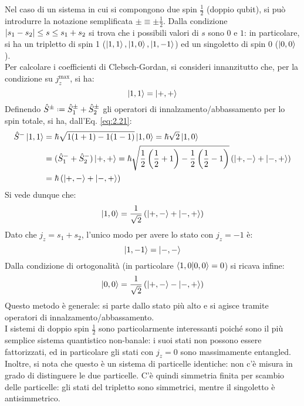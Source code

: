 Nel caso di un sistema in cui si compongono due spin $ \frac{1}{2} $ (doppio qubit), si può introdurre la notazione semplificata $ \pm \equiv \pm \frac{1}{2} $. Dalla condizione $ \left\lvert s_1 - s_2\right\rvert \le s \le s_1 + s_2 $ si trova che i possibili valori di $ s $ sono $ 0 $ e $ 1 $: in particolare, si ha un tripletto di spin 1 ($ \ket{1,1}, \ket{1,0},\ket{1,-1} $) ed un singoletto di spin 0 ($ \ket{0,0} $).\\
Per calcolare i coefficienti di Clebsch-Gordan, si consideri innanzitutto che, per la condizione su $ j_z^{\text{max}} $, si ha:
\begin{equation}
	\ket{1,1} = \ket{+,+}
	\label{eq:2.58}
\end{equation}
Definendo $ \hat{S}^{\pm} \defeq \hat{S}_1^{\pm} + \hat{S}_2^{\pm} $ gli operatori di innalzamento/abbassamento per lo spin totale, si ha, dall'Eq. \ref{eq:2.21}:
\begin{equation*}
	\begin{split}
		\hat{S}^- \ket{1,1}
		&= \hbar \sqrt{1 (1 + 1) - 1 (1 -1)} \ket{1,0} = \hbar \sqrt{2} \ket{1,0}\\
		&= (\hat{S}_1^- + \hat{S}_2^-) \ket{+,+} = \hbar \sqrt{ \frac{1}{2} \left( \frac{1}{2} + 1 \right) - \frac{1}{2} \left( \frac{1}{2} - 1 \right)} \left( \ket{+,-} + \ket{-,+} \right)\\
		&= \hbar \left( \ket{+,-} + \ket{-,+} \right)
	\end{split}
\end{equation*}
Si vede dunque che:
\begin{equation}
	\ket{1,0} = \frac{1}{\sqrt{2}} \left( \ket{+,-} + \ket{-,+} \right)
	\label{eq:2.59}
\end{equation}
Dato che $ j_z = s_1 + s_2 $, l'unico modo per avere lo stato con $ j_z = -1 $ è:
\begin{equation}
	\ket{1,-1} = \ket{-,-}
	\label{eq:2.60}
\end{equation}
Dalla condizione di ortogonalità (in particolare $ \braket{1,0 | 0,0} = 0 $) si ricava infine:
\begin{equation}
	\ket{0,0} = \frac{1}{\sqrt{2}} \left( \ket{+,-} - \ket{-,+} \right)
	\label{eq:2.61}
\end{equation}
Questo metodo è generale: si parte dallo stato più alto e si agisce tramite operatori di innalzamento/abbassamento.\\
I sistemi di doppio spin $ \frac{1}{2} $ sono particolarmente interessanti poiché sono il più semplice sistema quantistico non-banale: i suoi stati non possono essere fattorizzati, ed in particolare gli stati con $ j_z = 0 $ sono massimamente entangled.\\
Inoltre, si nota che questo è un sistema di particelle identiche: non c'è misura in grado di distinguere le due particelle. C'è quindi simmetria finita per scambio delle particelle: gli stati del tripletto sono simmetrici, mentre il singoletto è antisimmetrico.










